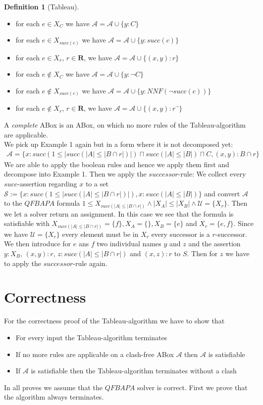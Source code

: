 \documentclass{book}
\theoremstyle{break}
\theoremstyle{definition}
\newtheorem{mydef}{Definition}
\begin{document}
\begin{mydef}[Tableau]
\begin{itemize}
\begin{itemize}
\item for each $e\in X_C$ we have $\mathcal{A}=\mathcal{A}\cup\{y:C\}$
\item for each $e\in X_{succ(c)}$ we have $\mathcal{A}=\mathcal{A}\cup\{y:succ(c)\}$
\item for each $e\in X_r$, $r\in\mathbf{R}$, we have $\mathcal{A}=\mathcal{A}\cup\{(x,y):r\}$
\item for each $e\notin X_C$ we have $\mathcal{A}=\mathcal{A}\cup\{y:\neg C\}$
\item for each $e\notin X_{succ(c)}$ we have $\mathcal{A}=\mathcal{A}\cup\{y: NNF(\neg succ(c))\}$
\item for each $e\notin X_r$, $r\in\mathbf{R}$, we have $\mathcal{A}=\mathcal{A}\cup\{(x,y):r^\neg\}$
\end{itemize}
\end{itemize}
\end{mydef}
A \textit{complete} ABox is an ABox, on which no more rules of the Tableau-algorithm are applicable.\\
We pick up Example 1 again but in a form where it is not decomposed yet:
\begin{align*}
\mathcal{A}=\{x:succ(1\leq|succ(|A|\leq|B\cap r|)|)\sqcap succ(|A|\leq |B|)\sqcap C, (x,y):B\cap r\}
\end{align*}
We are able to apply the boolean rules and hence we apply them first and decompose into Example 1. Then we apply the $successor$-rule: We collect every $succ$-assertion regarding $x$ to a set $\mathcal{S}:=\{x:succ(1\leq|succ(|A|\leq|B\cap r|)|), x:succ(|A|\leq |B|)\}$ and convert $\mathcal{A}$ to the $QFBAPA$ formula $1\leq X_{succ(|A|\leq |B\cap r|)}\wedge|X_A|\leq |X_B|\wedge \mathcal{U}=\{X_r\}$. Then we let a solver return an assignment. In this case we see that the formula is satisfiable with $X_{succ(|A|\leq |B\cap r|)}=\{f\},X_A=\{\},X_B=\{e\}$ and $X_r=\{e,f\}$. Since we have $\mathcal{U}=\{X_r\}$ every element must be in $X_r$ every successor is a $r$-successor. We then introduce for $e$ ans $f$ two individual names $y$ and $z$ and the assertion $y:X_B$, $(x,y):r$, $z:succ(|A|\leq|B\cap r|)$ and $(x,z):r$ to $S$. Then for $z$ we have to apply the $successor$-rule again.
\chapter{Correctness}
For the correctness proof of the Tableau-algorithm we have to show that
\begin{itemize}
\item For every input the Tableau-algorithm terminates
\item If no more rules are applicable on a clash-free ABox $\mathcal{A}$ then $\mathcal{A}$ is satisfiable
\item If $\mathcal{A}$ is satisfiable then the Tableau-algorithm terminates without a clash
\end{itemize}
In all proves we assume that the $QFBAPA$ solver is correct. First we prove that the algorithm always terminates.
\end{document}
